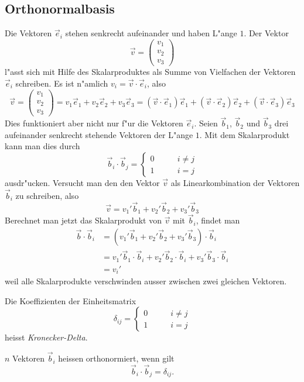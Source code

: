 \subsection{Orthonormalbasis}
Die Vektoren $\vec e_i$ stehen senkrecht aufeinander und haben
L"ange $1$. Der Vektor
\[
\vec v
=
\begin{pmatrix}v_1\\v_2\\v_3\end{pmatrix}
\]
l"asst sich mit Hilfe des Skalarproduktes als Summe von Vielfachen
der Vektoren $\vec e_i$ schreiben.
Es ist n"amlich $v_i=\vec v\cdot\vec e_i$, also
\[
\vec v
=
\begin{pmatrix}v_1\\v_2\\v_3\end{pmatrix}
=
v_1\vec e_1
+
v_2\vec e_2
+
v_3\vec e_3
=
(\vec v\cdot \vec e_1)\vec e_1
+
(\vec v\cdot \vec e_2)\vec e_2
+
(\vec v\cdot \vec e_3)\vec e_3
\]
Dies funktioniert aber nicht nur f"ur die Vektoren $\vec e_i$.
Seien $\vec b_1$, $\vec b_2$ und $\vec b_3$ drei aufeinander senkrecht
stehende Vektoren der L"ange $1$. Mit dem Skalarprodukt kann man
dies durch
\[
\vec b_i\cdot\vec b_j=\begin{cases}
0&\qquad i\ne j\\
1&\qquad i=j
\end{cases}
\]
ausdr"ucken. Versucht man den den Vektor $\vec v$ als Linearkombination
der Vektoren $\vec b_i$ zu schreiben, also
\[
\vec v
=
v_1'\vec b_1
+
v_2'\vec b_2
+
v_3'\vec b_3
\]
Berechnet man jetzt das Skalarprodukt von $\vec v$ mit $\vec b_i$,
findet man
\begin{align*}
\vec b\cdot \vec b_i
&=
(
v_1'\vec b_1
+
v_2'\vec b_2
+
v_3'\vec b_3
)\cdot
\vec b_i
\\
&=
v_1'\vec b_1\cdot\vec b_i
+
v_2'\vec b_2\cdot\vec b_i
+
v_3'\vec b_3\cdot\vec b_i
\\
&=v_i'
\end{align*}
weil alle Skalarprodukte verschwinden ausser zwischen
zwei gleichen Vektoren.

\begin{definition} Die Koeffizienten der Einheitsmatrix
\[
\delta_{ij}=
\begin{cases}
0&\qquad i\ne j\\
1&\qquad i=j
\end{cases}
\]
heisst {\em Kronecker-Delta}.
\end{definition}

\begin{definition}
$n$ Vektoren $\vec b_i$ heissen orthonormiert, wenn gilt
\[
\vec b_i\cdot\vec b_j=\delta_{ij}.
\]
\end{definition}

